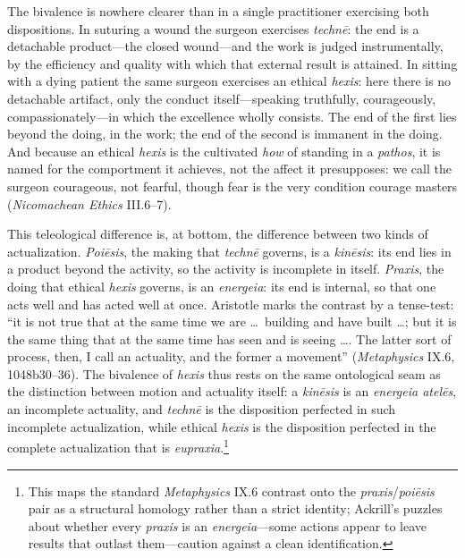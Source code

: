 \documentclass{article}
\begin{document}
The bivalence is nowhere clearer than in a single practitioner exercising both dispositions. In suturing a wound the surgeon exercises \textit{technē}: the end is a detachable product---the closed wound---and the work is judged instrumentally, by the efficiency and quality with which that external result is attained. In sitting with a dying patient the same surgeon exercises an ethical \textit{hexis}: here there is no detachable artifact, only the conduct itself---speaking truthfully, courageously, compassionately---in which the excellence wholly consists. The end of the first lies beyond the doing, in the work; the end of the second is immanent in the doing. And because an ethical \textit{hexis} is the cultivated \textit{how} of standing in a \textit{pathos}, it is named for the comportment it achieves, not the affect it presupposes: we call the surgeon courageous, not fearful, though fear is the very condition courage masters (\textit{Nicomachean Ethics} III.6--7).

This teleological difference is, at bottom, the difference between two kinds of actualization. \textit{Poiēsis}, the making that \textit{technē} governs, is a \textit{kinēsis}: its end lies in a product beyond the activity, so the activity is incomplete in itself. \textit{Praxis}, the doing that ethical \textit{hexis} governs, is an \textit{energeia}: its end is internal, so that one acts well and has acted well at once. Aristotle marks the contrast by a tense-test: ``it is not true that at the same time we are \ldots\ building and have built \ldots; but it is the same thing that at the same time has seen and is seeing \ldots. The latter sort of process, then, I call an actuality, and the former a movement'' (\textit{Metaphysics} IX.6, 1048b30--36). The bivalence of \textit{hexis} thus rests on the same ontological seam as the distinction between motion and actuality itself: a \textit{kinēsis} is an \textit{energeia atelēs}, an incomplete actuality, and \textit{technē} is the disposition perfected in such incomplete actualization, while ethical \textit{hexis} is the disposition perfected in the complete actualization that is \textit{eupraxia}.\footnote{This maps the standard \textit{Metaphysics} IX.6 contrast onto the \textit{praxis}/\textit{poiēsis} pair as a structural homology rather than a strict identity; Ackrill's puzzles about whether every \textit{praxis} is an \textit{energeia}---some actions appear to leave results that outlast them---caution against a clean identification.}
\end{document}
